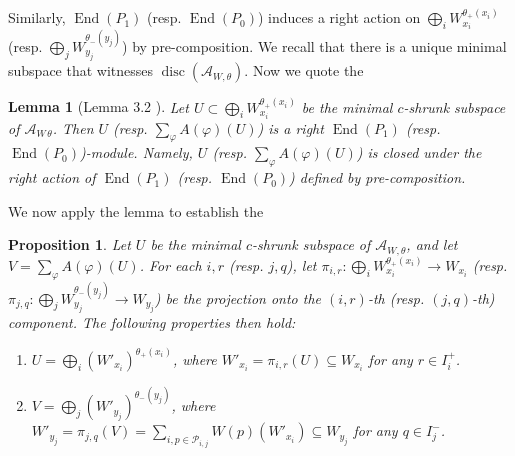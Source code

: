 \documentclass[a4paper]{amsart}
\numberwithin{equation}{section}
\theoremstyle{plain}
\newtheorem{lemma}[theorem]{Lemma}
\newtheorem{proposition}[theorem]{Proposition}
\theoremstyle{definition}
\DeclareMathOperator{\Endo}{End}
\DeclareMathOperator{\disc}{disc}
\begin{document}
Similarly, $\Endo(P_1)$ (resp. $\Endo(P_0)$) induces a right action on $\bigoplus_{i}W_{x_i}^{\theta_{+}(x_i)}$ (resp. $\bigoplus_{j}W_{y_j}^{\theta_{-}(y_j)}$) by pre-composition. We recall  that there is a unique minimal subspace that witnesses $\disc(\mathcal{A}_{W,\theta}).$ Now we quote the 
\begin{lemma}[Lemma 3.2 \cite{https://doi.org/10.48550/arxiv.2111.00039}]
Let $U\subset\bigoplus_{i}W_{x_i}^{\theta_{+}(x_i)}$ be the minimal $c$-shrunk subspace of $\mathcal{A}_{W\,\theta}$. Then $U$ (resp. $\sum_{\varphi}A(\varphi)(U)$) is a right $\Endo(P_1)$ (resp.  $\Endo(P_0)$)-module. Namely, $U$ (resp. $\sum_{\varphi}A(\varphi)(U)$) is closed under the right action of $\Endo(P_1)$ (resp. $\Endo(P_0)$) defined by pre-composition.
\end{lemma}
We now apply the lemma to establish the 
\begin{proposition}\label{subrep_preconstruction}
Let $U$ be the minimal $c$-shrunk subspace of $\mathcal{A}_{W,\theta}$, and let $V=\sum_{\varphi}A(\varphi)(U)$. For each $i,r$ (resp. $j,q$), let $\pi_{i,r}:\bigoplus_{i}W_{x_i}^{\theta_{+}(x_i)}\rightarrow W_{x_i}$ (resp. $\pi_{j,q}: \bigoplus_{j}W_{y_j}^{\theta_{-}(y_j)}\rightarrow W_{y_j}$) be the projection onto the $(i,r)$-th (resp. $(j,q)$-th) component.
The following properties then hold:
\begin{enumerate}
    \item $U=\bigoplus_{i}(W'_{x_i})^{\theta_{+}(x_i)}$, where $W'_{x_i}=\pi_{i,r}(U)\subseteq W_{x_i}$ for any $r\in I^{+}_{i}$.
    \item $V=\bigoplus_{j}(W'_{y_j})^{\theta_{-}(y_j)}$, where $W'_{y_j}=\pi_{j,q}(V)=\sum_{i,p\in\mathcal{P}_{i,j}}W(p)(W'_{x_i})\subseteq W_{y_j}$ for any $q\in I_{j}^{-}$.
\end{enumerate}
\end{proposition}
\end{document}
